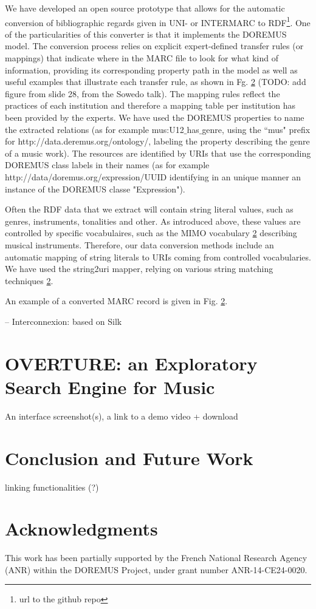 \documentclass[runningheads,a4paper]{llncs}
\begin{document}
We have developed an open source prototype that allows for the automatic conversion of bibliographic regards given in UNI- or INTERMARC to RDF\footnote{url to the github repo}. One of the particularities of this converter is that it implements the DOREMUS model. The conversion process relies on explicit expert-defined transfer rules (or mappings) that indicate where in the MARC file to look for what kind of information, providing its corresponding property path in the model as well as useful examples that illustrate each transfer rule, as shown in Fg. \ref{} (TODO: add figure from slide 28, from the Sowedo talk). The mapping rules reflect the practices of each institution and therefore a mapping table per institution has been provided by the experts. We have used the DOREMUS properties to name the extracted relations (as for example mus:U12$\_$has$\_$genre, using the ``mus" prefix for http://data.deremus.org/ontology/, labeling the property describing the genre of a music work). The resources are identified by URIs that use the corresponding DOREMUS class labels in their names (as for example http://data/doremus.org/expression/UUID identifying in an unique manner an instance of the DOREMUS classe "Expression"). 

Often the RDF data that we extract will contain string literal values, such as genres, instruments, tonalities and other. As introduced above, these values are controlled by specific vocabulaires, such as the MIMO vocabulary \ref{} describing musical instruments. Therefore, our data conversion methods include an automatic mapping of string literals to URIs coming from controlled vocabularies. We have used the string2uri mapper, relying on various string matching techniques \ref{}.

An example of a converted MARC record is given in Fig. \ref{}.  

-- Interconnexion: based on Silk


\section{OVERTURE: an Exploratory Search Engine for Music}

An interface screenshot(s), a link to a demo video + download


\section{Conclusion and Future Work}

linking functionalities (?)

\section*{Acknowledgments}
This work has been partially supported by the French National Research Agency (ANR) within the DOREMUS Project, under grant number ANR-14-CE24-0020.



\end{document}
